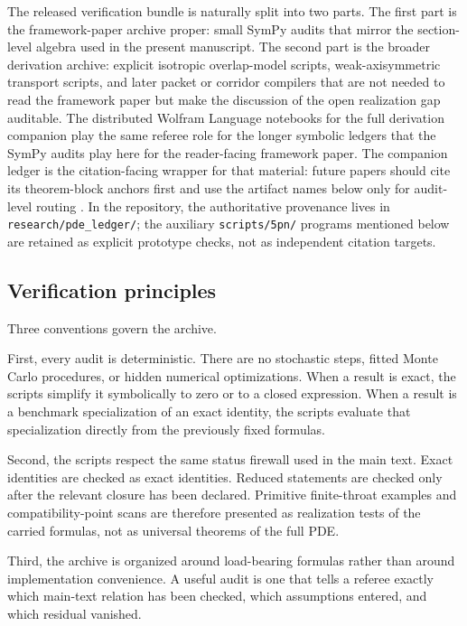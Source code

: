 \documentclass[11pt]{article}
\theoremstyle{definition}
\begin{document}
The released verification bundle is naturally split into two parts. The first part is the framework-paper archive proper: small SymPy audits that mirror the section-level algebra used in the present manuscript. The second part is the broader derivation archive: explicit isotropic overlap-model scripts, weak-axisymmetric transport scripts, and later packet or corridor compilers that are not needed to read the framework paper but make the discussion of the open realization gap auditable. The distributed Wolfram Language notebooks for the full derivation companion play the same referee role for the longer symbolic ledgers that the SymPy audits play here for the reader-facing framework paper. The companion ledger is the citation-facing wrapper for that material: future papers should cite its theorem-block anchors first and use the artifact names below only for audit-level routing \cite{Norris2026PDELedger}. In the repository, the authoritative provenance lives in \nolinkurl{research/pde_ledger/}; the auxiliary \nolinkurl{scripts/5pn/} programs mentioned below are retained as explicit prototype checks, not as independent citation targets.

\subsection{Verification principles}

Three conventions govern the archive.

First, every audit is deterministic. There are no stochastic steps, fitted Monte Carlo procedures, or hidden numerical optimizations. When a result is exact, the scripts simplify it symbolically to zero or to a closed expression. When a result is a benchmark specialization of an exact identity, the scripts evaluate that specialization directly from the previously fixed formulas.

Second, the scripts respect the same status firewall used in the main text. Exact identities are checked as exact identities. Reduced statements are checked only after the relevant closure has been declared. Primitive finite-throat examples and compatibility-point scans are therefore presented as realization tests of the carried formulas, not as universal theorems of the full PDE.

Third, the archive is organized around load-bearing formulas rather than around implementation convenience. A useful audit is one that tells a referee exactly which main-text relation has been checked, which assumptions entered, and which residual vanished.
\end{document}

